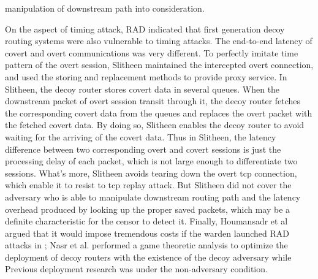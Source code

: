 \documentclass[conference]{IEEEtran}
\begin{document}
manipulation of downstream path into consideration.

On the aspect of timing attack, RAD indicated that first generation decoy routing systems were also vulnerable to timing attacks. The end-to-end latency of covert and overt communications was very different. To perfectly imitate time pattern of the overt session, Slitheen maintained the intercepted overt connection, and used the storing and replacement methods to provide proxy service. In Slitheen, the decoy router stores covert data in several queues. When the downstream packet of overt session transit through it, the decoy router fetches the corresponding covert data from the queues and replaces the overt packet with the fetched covert data. By doing so, Slitheen enables the decoy router to avoid waiting for the arriving of the covert data. Thus in Slitheen, the latency difference between two corresponding overt and covert sessions is just the processing delay of each packet, which is not large enough to differentiate two sessions. What’s more, Slitheen avoids tearing down the overt tcp connection, which enable it to resist to tcp replay attack. But Slitheen did not cover the adversary who is able to manipulate downstream routing path and the latency overhead produced by looking up the proper saved packets, which may be a definite characteristic for the censor to detect it. Finally, Houmansadr et al argued that it would impose tremendous costs if the warden launched RAD attacks in \cite{truecost}; Nasr et al.\cite{game} performed a game theoretic analysis to optimize the deployment of decoy routers with the existence of the decoy adversary while Previous deployment research was under the non-adversary condition\cite{optimize}\cite{combinatoric}.
\end{document}

